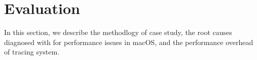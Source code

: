 \section{Evaluation}\label{sec:eval}

In this section, we describe the methodlogy of case study, the root causes
diagnosed with \xxx for performance issues in macOS,  and the performance
overhead of \xxx tracing system.






